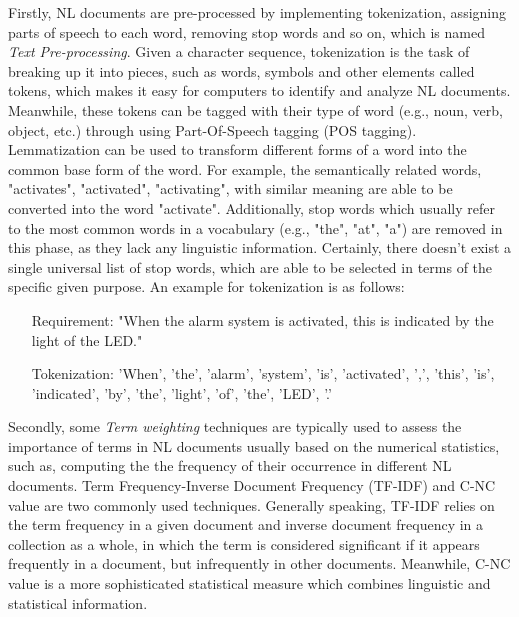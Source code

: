 \documentclass[graybox]{svmult}
\begin{document}
Firstly, NL documents are pre-processed by implementing tokenization, assigning parts of speech to each word, removing stop words and so on, which is named \emph{Text Pre-processing}. Given a character sequence, tokenization is the task of breaking up it into pieces, such as words, symbols and other elements called tokens, which makes it easy for computers to identify and analyze NL documents. Meanwhile, these tokens can be tagged with their type of word (e.g., noun, verb, object, etc.) through using Part-Of-Speech tagging (POS tagging). Lemmatization can be used to transform different forms of a word into the common base form of the word. For example, the semantically related words, "activates", "activated", "activating", with similar meaning are able to be converted into the word "activate". Additionally, stop words which usually refer to the most common words in a vocabulary (e.g., "the", "at", "a") are removed in this phase, as they lack any linguistic information. Certainly, there doesn't exist a single universal list of stop words, which are able to be selected in terms of the specific given purpose. An example for tokenization is as follows:

\begin{shaded}
\begin{itemize}
    \item [Requirement:] "When the alarm system is activated, this is indicated by the light of the LED."
    \item [Tokenization:] 'When', 'the', 'alarm', 'system', 'is', 'activated', ',', 'this', 'is', 'indicated', 'by', 'the', 'light', 'of', 'the', 'LED', '.'
\end{itemize}
\end{shaded} 

Secondly, some \emph{Term weighting} techniques are typically used to assess the importance of terms in NL documents usually based on the numerical statistics, such as, computing the the frequency of their occurrence in different NL documents. Term Frequency-Inverse Document Frequency (TF-IDF) and C-NC value are two commonly used techniques. 
Generally speaking, TF-IDF relies on the term frequency in a given document and inverse document frequency in a collection as a whole, in which the term is considered significant if it appears frequently in a document, but infrequently in other documents. Meanwhile, C-NC value is a more sophisticated statistical measure which combines linguistic and statistical information. 
\end{document}
